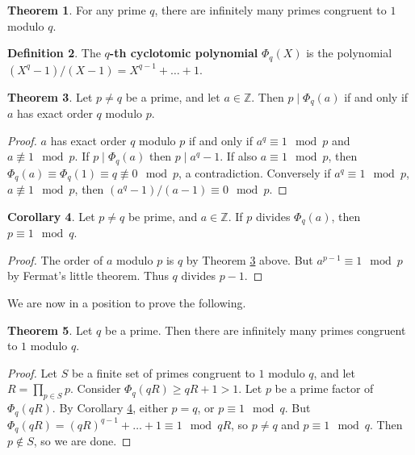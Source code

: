 \documentclass{article}
\newcommand{\Z}{\mathbb{Z}}
\newcommand{\rb}[1]{\left( #1 \right)}
\theoremstyle{definition}\newtheorem{definition}{Definition}
\theoremstyle{definition}\newtheorem{remark}[definition]{Remark}
\theoremstyle{definition}\newtheorem*{example}{Example}
\theoremstyle{definition}\newtheorem*{note}{Note}
\newtheorem{theorem}[definition]{Theorem}
\newtheorem{corollary}[definition]{Corollary}
\begin{document}
\begin{theorem}
For any prime $ q $, there are infinitely many primes congruent to $ 1 $ modulo $ q $.
\end{theorem}

\begin{definition}
The \textbf{$ q $-th cyclotomic polynomial} $ \Phi_q\rb{X} $ is the polynomial $ \rb{X^q - 1} / \rb{X - 1} = X^{q - 1} + \dots + 1 $.
\end{definition}

\begin{theorem}
\label{thm:91}
Let $ p \ne q $ be a prime, and let $ a \in \Z $. Then $ p \mid \Phi_q\rb{a} $ if and only if $ a $ has exact order $ q $ modulo $ p $.
\end{theorem}

\begin{proof}
$ a $ has exact order $ q $ modulo $ p $ if and only if $ a^q \equiv 1 \mod p $ and $ a \not\equiv 1 \mod p $. If $ p \mid \Phi_q\rb{a} $ then $ p \mid a^q - 1 $. If also $ a \equiv 1 \mod p $, then $ \Phi_q\rb{a} \equiv \Phi_q\rb{1} \equiv q \not\equiv 0 \mod p $, a contradiction. Conversely if $ a^q \equiv 1 \mod p $, $ a \not\equiv 1 \mod p $, then $ \rb{a^q - 1} / \rb{a - 1} \equiv 0 \mod p $.
\end{proof}


\begin{corollary}
\label{cor:92}
Let $ p \ne q $ be prime, and $ a \in \Z $. If $ p $ divides $ \Phi_q\rb{a} $, then $ p \equiv 1 \mod q $.
\end{corollary}

\begin{proof}
The order of $ a $ modulo $ p $ is $ q $ by Theorem \ref{thm:91} above. But $ a^{p - 1} \equiv 1 \mod p $ by Fermat's little theorem. Thus $ q $ divides $ p - 1 $.
\end{proof}

We are now in a position to prove the following.

\begin{theorem}
Let $ q $ be a prime. Then there are infinitely many primes congruent to $ 1 $ modulo $ q $.
\end{theorem}

\begin{proof}
Let $ S $ be a finite set of primes congruent to $ 1 $ modulo $ q $, and let $ R = \prod_{p \in S} p $. Consider $ \Phi_q\rb{qR} \ge qR + 1 > 1 $. Let $ p $ be a prime factor of $ \Phi_q\rb{qR} $. By Corollary \ref{cor:92}, either $ p = q $, or $ p \equiv 1 \mod q $. But $ \Phi_q\rb{qR} = \rb{qR}^{q - 1} + \dots + 1 \equiv 1 \mod qR $, so $ p \ne q $ and $ p \equiv 1 \mod q $. Then $ p \notin S $, so we are done.
\end{proof}
\end{document}
